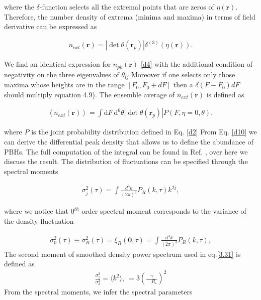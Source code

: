 \begin{appendices}
where the $\delta$-function selects all the extremal points that are zeros of $\eta(\mathbf{r})$. Therefore, the number density of extrema (minima and maxima) in terms of field derivative can be expressed as

\begin{align}
    n_{e x t}(\mathbf{r})=\left|\operatorname{det} \theta\left(\mathbf{r}_{p}\right)\right| \delta^{(3)}(\eta(\mathbf{r})) .\label{d9}
\end{align}

We find an identical expression for $n_{p k}(\mathbf{r})$ \ref{d4} with the additional condition of negativity on the three eigenvalues of $\theta_{i j}$ Moreover if one selects only those maxima whose heights are in the range $\left[F_{0}, F_{0}+d F\right]$ then a $\delta\left(F-F_{0}\right) d F$ should multiply equation 4.9). The ensemble average of $n_{e x t}(\mathbf{r})$ is defined as

\begin{align}
    \left\langle n_{e x t}(\mathbf{r})\right\rangle=\int \mathrm{d} F \mathrm{~d}^{6} \theta\left|\operatorname{det} \theta\left(\mathbf{r}_{p}\right)\right| P(F, \eta=0, \theta), \label{d10}
\end{align}

where $P$ is the joint probability distribution defined in Eq. \ref{d2} From Eq. \ref{d10} we can derive the differential peak density that allows us to define the abundance of PBHs. The full computation of the integral can be found in Ref. \cite{1986ApJ...304...15B}, over here we discuss the result. The distribution of fluctuations can be specified through the spectral moments

\begin{align}
    \sigma_{j}^{2}(\tau)=\int \frac{d^{3} k}{(2 \pi)^{3}} P_{R}(k, \tau) k^{2 j},\label{d11}
\end{align}

where we notice that $0^{th}$ order spectral moment corresponds to the variance of the density fluctuation

\begin{align}
    \sigma_{0}^{2}(\tau) \equiv \sigma_{R}^{2}(\tau)=\xi_{R}(\mathbf{0}, \tau)=\int \frac{\mathrm{d}^{3} k}{(2 \pi)^{3}} P_{R}(k, \tau), \label{d12}
\end{align}
The second moment of smoothed density power spectrum used in eq.\ref{3.31} is defined as
\begin{align}
    \frac{\sigma_{1}^2}{\sigma_{2}^2} = \langle k^2 \rangle,\ = 3\left(\frac{\gamma}{\quad R_{\star}} \right)^2\label{d13}
\end{align}
From the spectral moments, we infer the spectral parameters


\end{appendices}
